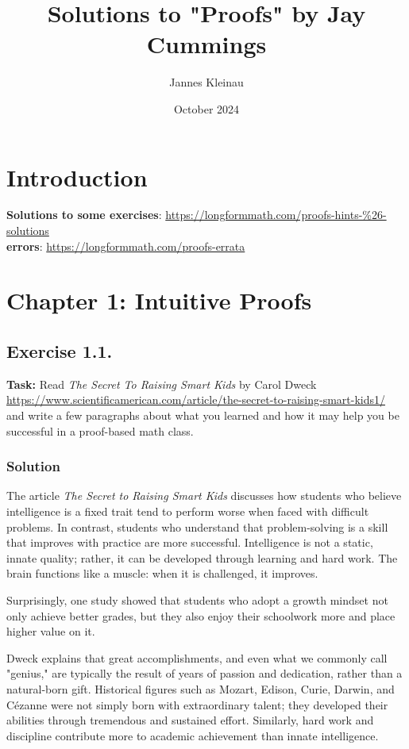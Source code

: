 \documentclass{article}
\title{Solutions to "Proofs" by Jay Cummings}
\author{Jannes Kleinau}
\date{October 2024}
\begin{document}
\maketitle
\tableofcontents %

\section{Introduction}
\textbf{Solutions to some exercises}: \url{https://longformmath.com/proofs-hints-\%26-solutions} \\
\textbf{errors}: \url{https://longformmath.com/proofs-errata} 

\newpage %

\section{Chapter 1: Intuitive Proofs}
\subsection{Exercise 1.1.}
\textbf{Task:} Read \textit{The Secret To Raising Smart Kids} by Carol Dweck \\
\url{https://www.scientificamerican.com/article/the-secret-to-raising-smart-kids1/} \\
and write a few paragraphs about what you learned and how it may help you be successful in a proof-based math class.

\subsubsection*{Solution}

The article \textit{The Secret to Raising Smart Kids} discusses how students who believe intelligence is a fixed trait tend to perform worse when faced with difficult problems. In contrast, students who understand that problem-solving is a skill that improves with practice are more successful. Intelligence is not a static, innate quality; rather, it can be developed through learning and hard work. The brain functions like a muscle: when it is challenged, it improves.

Surprisingly, one study showed that students who adopt a growth mindset not only achieve better grades, but they also enjoy their schoolwork more and place higher value on it.

Dweck explains that great accomplishments, and even what we commonly call "genius," are typically the result of years of passion and dedication, rather than a natural-born gift. Historical figures such as Mozart, Edison, Curie, Darwin, and Cézanne were not simply born with extraordinary talent; they developed their abilities through tremendous and sustained effort. Similarly, hard work and discipline contribute more to academic achievement than innate intelligence.
\end{document}
